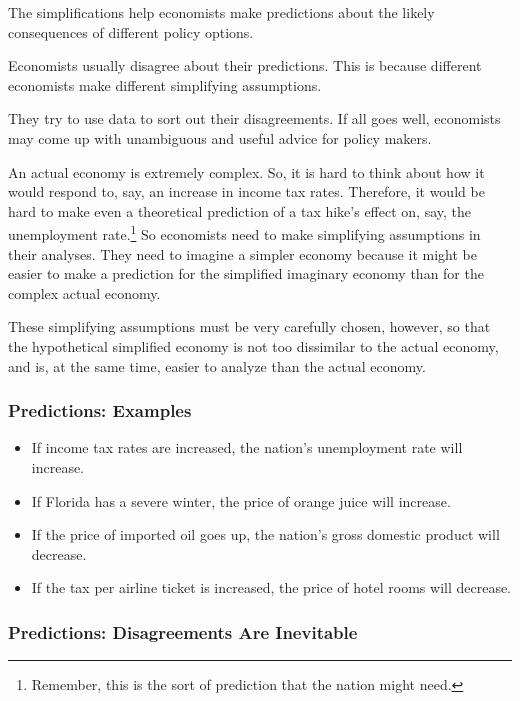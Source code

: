 \documentclass[
  letterpaper,
]{book}
\begin{document}
The simplifications help economists make predictions about the likely
consequences of different policy options.

Economists usually disagree about their predictions. This is because
different economists make different simplifying assumptions.

They try to use data to sort out their disagreements. If all goes well,
economists may come up with unambiguous and useful advice for policy
makers.

An actual economy is extremely complex. So, it is hard to think about
how it would respond to, say, an increase in income tax rates.
Therefore, it would be hard to make even a theoretical prediction of a
tax hike's effect on, say, the unemployment rate.\footnote{Remember,
  this is the sort of prediction that the nation might need.} So
economists need to make simplifying assumptions in their analyses. They
need to imagine a simpler economy because it might be easier to make a
prediction for the simplified imaginary economy than for the complex
actual economy.

These simplifying assumptions must be very carefully chosen, however, so
that the hypothetical simplified economy is not too dissimilar to the
actual economy, and is, at the same time, easier to analyze than the
actual economy.

\subsubsection{Predictions: Examples}\label{predictions-examples}

\begin{itemize}
\item
  If income tax rates are increased, the nation's unemployment rate will
  increase.
\item
  If Florida has a severe winter, the price of orange juice will
  increase.
\item
  If the price of imported oil goes up, the nation's gross domestic
  product will decrease.
\item
  If the tax per airline ticket is increased, the price of hotel rooms
  will decrease.
\end{itemize}

\subsubsection{Predictions: Disagreements Are
Inevitable}\label{predictions-disagreements-are-inevitable}
\end{document}
